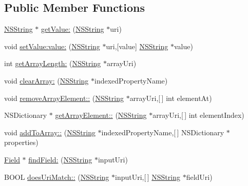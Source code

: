 \subsection*{\-Public \-Member \-Functions}
\begin{DoxyCompactItemize}
\item 
\hyperlink{class_n_s_string}{\-N\-S\-String} $\ast$ \hyperlink{interface_mobile_object_a100c5b1092c4942782790ee9d313e9eb}{get\-Value\-:} (\hyperlink{class_n_s_string}{\-N\-S\-String} $\ast$uri)
\item 
void \hyperlink{interface_mobile_object_aaf26c3b84a9884180398c5e0b129dfae}{set\-Value\-:value\-:} (\hyperlink{class_n_s_string}{\-N\-S\-String} $\ast$uri,\mbox{[}value\mbox{]} \hyperlink{class_n_s_string}{\-N\-S\-String} $\ast$value)
\item 
int \hyperlink{interface_mobile_object_a98a4f223b4b04adcf8c485bd0a49229b}{get\-Array\-Length\-:} (\hyperlink{class_n_s_string}{\-N\-S\-String} $\ast$array\-Uri)
\item 
void \hyperlink{interface_mobile_object_ab84b8d442ba72b26b953943dc76b0057}{clear\-Array\-:} (\hyperlink{class_n_s_string}{\-N\-S\-String} $\ast$indexed\-Property\-Name)
\item 
void \hyperlink{interface_mobile_object_a1ab214f95389eee21be8d37c352fa1e5}{remove\-Array\-Element\-::} (\hyperlink{class_n_s_string}{\-N\-S\-String} $\ast$array\-Uri,\mbox{[}$\,$\mbox{]} int element\-At)
\item 
\-N\-S\-Dictionary $\ast$ \hyperlink{interface_mobile_object_a13252151948be1be16bc93efd1ead68f}{get\-Array\-Element\-::} (\hyperlink{class_n_s_string}{\-N\-S\-String} $\ast$array\-Uri,\mbox{[}$\,$\mbox{]} int element\-Index)
\item 
void \hyperlink{interface_mobile_object_a2a3e500096bfa9318bb42702d62b22bc}{add\-To\-Array\-::} (\hyperlink{class_n_s_string}{\-N\-S\-String} $\ast$indexed\-Property\-Name,\mbox{[}$\,$\mbox{]} \-N\-S\-Dictionary $\ast$properties)
\item 
\hyperlink{interface_field}{\-Field} $\ast$ \hyperlink{interface_mobile_object_af67107d4bdd2d493709dfb5550bd0b71}{find\-Field\-:} (\hyperlink{class_n_s_string}{\-N\-S\-String} $\ast$input\-Uri)
\item 
\-B\-O\-O\-L \hyperlink{interface_mobile_object_a72146ccc4b6fdc8f630b533244eaf359}{does\-Uri\-Match\-::} (\hyperlink{class_n_s_string}{\-N\-S\-String} $\ast$input\-Uri,\mbox{[}$\,$\mbox{]} \hyperlink{class_n_s_string}{\-N\-S\-String} $\ast$field\-Uri)
\item 

\end{DoxyCompactItemize}
